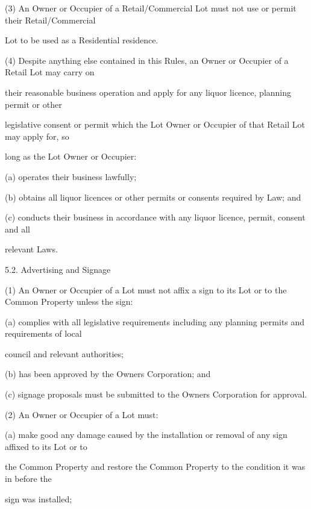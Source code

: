 \documentclass{article}
\begin{document}
{\fontsize{9.962}{1}(3) An Owner or Occupier of a Retail/Commercial Lot must not use or permit their Retail/Commercial }

{\fontsize{10.02}{1}Lot to be used as a Residential residence. }

{\fontsize{9.962}{1}(4) Despite anything else contained in this Rules, an Owner or Occupier of a Retail Lot may carry on }

{\fontsize{10.02}{1}their reasonable business operation and apply for any liquor licence, planning permit or other }

{\fontsize{10.02}{1}legislative consent or permit which the Lot Owner or Occupier of that Retail Lot may apply for, so }

{\fontsize{10.02}{1}long as the Lot Owner or Occupier: }

{\fontsize{9.962}{1}(a) operates their business lawfully; }

{\fontsize{9.962}{1}(b) obtains all liquor licences or other permits or consents required by Law; and }

{\fontsize{9.962}{1}(c) conducts their business in accordance with any liquor licence, permit, consent and all }

{\fontsize{10.02}{1}relevant Laws. }

{\fontsize{9.99}{1}5.2. Advertising and Signage }

{\fontsize{9.962}{1}(1) An Owner or Occupier of a Lot must not affix a sign to its Lot or to the Common Property unless the sign: }

{\fontsize{9.962}{1}(a) complies with all legislative requirements including any planning permits and requirements of local }

{\fontsize{10.02}{1}council and relevant authorities; }

{\fontsize{9.962}{1}(b) has been approved by the Owners Corporation; and }

{\fontsize{9.962}{1}(c) signage proposals must be submitted to the Owners Corporation for approval. }

{\fontsize{9.962}{1}(2) An Owner or Occupier of a Lot must: }

{\fontsize{9.962}{1}(a) make good any damage caused by the installation or removal of any sign affixed to its Lot or to }

{\fontsize{10.02}{1}the Common Property and restore the Common Property to the condition it was in before the }

{\fontsize{10.02}{1}sign was installed; }
\end{document}
